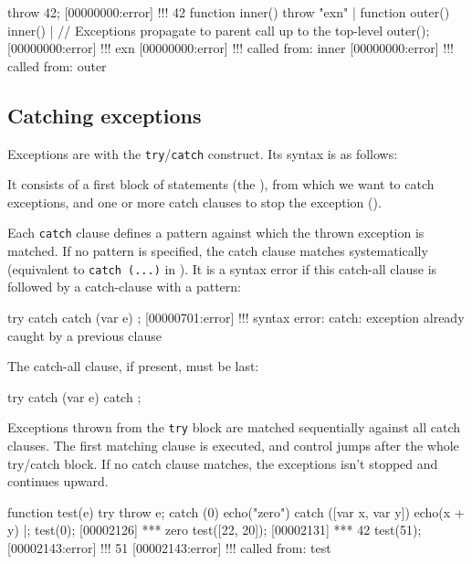 \begin{urbiscript}
throw 42;
[00000000:error] !!! 42
function inner() { throw "exn" } |
function outer() { inner() }|
// Exceptions propagate to parent call up to the top-level
outer();
[00000000:error] !!! exn
[00000000:error] !!!    called from: inner
[00000000:error] !!!    called from: outer
\end{urbiscript}

\subsection{Catching exceptions}
\label{sec:lang:catch}

Exceptions are  with the
\lstinline{try}/\lstinline{catch} construct. Its syntax is as follows:


It consists of a first block of statements (the ), from which
we want to catch exceptions, and one or more catch clauses to stop the
exception ().

Each \lstinline{catch} clause defines a pattern against which the thrown
exception is matched. If no pattern is specified, the catch clause matches
systematically (equivalent to \lstinline|catch (...)| in \Cxx).  It is a
syntax error if this catch-all clause is followed by a catch-clause with a
pattern:

\begin{urbiscript}
try {} catch {} catch (var e) {};
[00000701:error] !!! syntax error: catch: exception already caught by a previous clause
\end{urbiscript}

\noindent
The catch-all clause, if present, must be last:

\begin{urbiscript}
try {} catch (var e) {} catch {};
\end{urbiscript}

Exceptions thrown from the \lstinline{try} block are matched sequentially
against all catch clauses. The first matching clause is executed, and
control jumps after the whole try/catch block. If no catch clause matches,
the exceptions isn't stopped and continues upward.

\begin{urbiscript}
function test(e)
{
  try
  { throw e;  }
  catch (0)
  { echo("zero") }
  catch ([var x, var y])
  { echo(x + y) }
}|;
test(0);
[00002126] *** zero
test([22, 20]);
[00002131] *** 42
test(51);
[00002143:error] !!! 51
[00002143:error] !!!    called from: test
\end{urbiscript}

